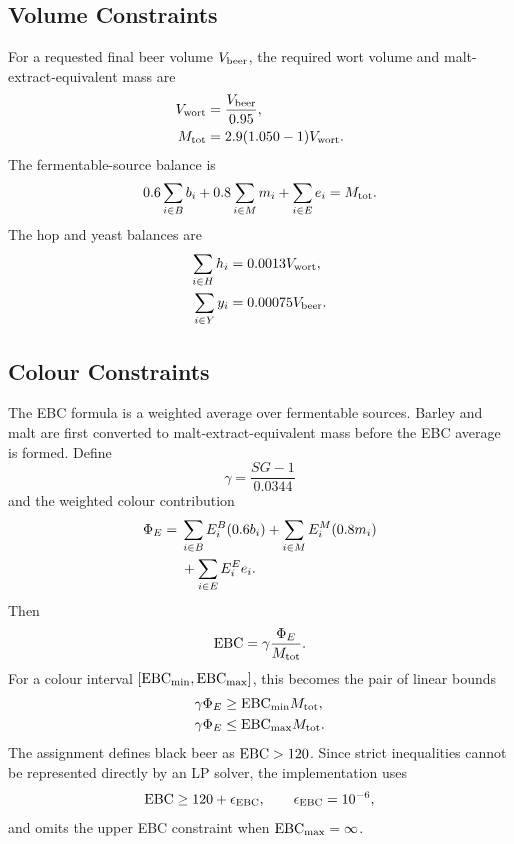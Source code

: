 \subsection{Volume Constraints}
\label{sec:volume-constraints}
For a requested final beer volume $V_{\mathrm{beer}}$, the required wort volume and malt-extract-equivalent mass are
\begin{align}
  V_{\mathrm{wort}} &= \frac{V_{\mathrm{beer}}}{0.95}, \label{eq:model-wort-from-beer}\\
  M_{\mathrm{tot}} &= 2.9(1.050-1)V_{\mathrm{wort}}. \label{eq:model-extract-total}
\end{align}
The fermentable-source balance is
\begin{equation}
  0.6\sum_{i \in B}b_i
  +0.8\sum_{i \in M}m_i
  +\sum_{i \in E}e_i
  = M_{\mathrm{tot}}.
  \label{eq:malt-source-balance}
\end{equation}
The hop and yeast balances are
\begin{align}
  \sum_{i \in H}h_i &= 0.0013 V_{\mathrm{wort}}, \label{eq:hop-balance}\\
  \sum_{i \in Y}y_i &= 0.00075 V_{\mathrm{beer}}. \label{eq:yeast-balance}
\end{align}

\subsection{Colour Constraints}
\label{sec:colour-constraints}
The EBC formula is a weighted average over fermentable sources. Barley and malt are first converted to malt-extract-equivalent mass before the EBC average is formed. Define
\begin{equation}
  \gamma = \frac{SG-1}{0.0344}
  \label{eq:gamma}
\end{equation}
and the weighted colour contribution
\begin{align}
  \Phi_E ={}&
    \sum_{i \in B} E^B_i(0.6b_i)
    +\sum_{i \in M} E^M_i(0.8m_i) \notag\\
  &+\sum_{i \in E} E^E_i e_i.
  \label{eq:ebc-contribution}
\end{align}
Then
\begin{equation}
  \mathrm{EBC} = \gamma\frac{\Phi_E}{M_{\mathrm{tot}}}.
  \label{eq:ebc-average}
\end{equation}
For a colour interval $[\mathrm{EBC}_{\min},\mathrm{EBC}_{\max}]$, this becomes the pair of linear bounds
\begin{align}
  \gamma\Phi_E &\geq \mathrm{EBC}_{\min}M_{\mathrm{tot}}, \label{eq:ebc-lower}\\
  \gamma\Phi_E &\leq \mathrm{EBC}_{\max}M_{\mathrm{tot}}. \label{eq:ebc-upper}
\end{align}
The assignment defines black beer as $\mathrm{EBC}>120$. Since strict inequalities cannot be represented directly by an LP solver, the implementation uses
\begin{equation}
  \mathrm{EBC} \geq 120+\epsilon_{\mathrm{EBC}}, \qquad \epsilon_{\mathrm{EBC}}=10^{-6},
  \label{eq:black-epsilon}
\end{equation}
and omits the upper EBC constraint when $\mathrm{EBC}_{\max}=\infty$.

